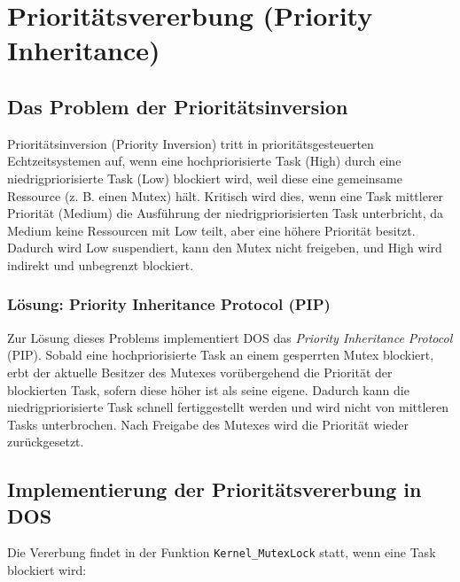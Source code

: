 \chapter{Prioritätsvererbung (Priority Inheritance)}
\label{ch:prioritaetsvererbung}

\section{Das Problem der Prioritätsinversion}
Prioritätsinversion (Priority Inversion) tritt in prioritätsgesteuerten Echtzeitsystemen auf, wenn eine hochpriorisierte Task (High) durch eine niedrigpriorisierte Task (Low) blockiert wird, weil diese eine gemeinsame Ressource (z. B. einen Mutex) hält. 
Kritisch wird dies, wenn eine Task mittlerer Priorität (Medium) die Ausführung der niedrigpriorisierten Task unterbricht, da Medium keine Ressourcen mit Low teilt, aber eine höhere Priorität besitzt. Dadurch wird Low suspendiert, kann den Mutex nicht freigeben, und High wird indirekt und unbegrenzt blockiert.

\subsection{Lösung: Priority Inheritance Protocol (PIP)}
Zur Lösung dieses Problems implementiert DOS das \textit{Priority Inheritance Protocol} (PIP). Sobald eine hochpriorisierte Task an einem gesperrten Mutex blockiert, erbt der aktuelle Besitzer des Mutexes vorübergehend die Priorität der blockierten Task, sofern diese höher ist als seine eigene. Dadurch kann die niedrigpriorisierte Task schnell fertiggestellt werden und wird nicht von mittleren Tasks unterbrochen. Nach Freigabe des Mutexes wird die Priorität wieder zurückgesetzt.

\section{Implementierung der Prioritätsvererbung in DOS}
Die Vererbung findet in der Funktion \lstinline|Kernel_MutexLock| statt, wenn eine Task blockiert wird:

